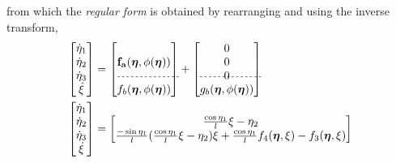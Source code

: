 %
from which the \textit{regular form} is obtained by rearranging and using the inverse transform,
\begin{align}
  \begin{bmatrix}
    \dot{\eta}_1   \\
    \dot{\eta}_2   \\
    \dot{\eta}_3   \\  %
    \dot{\xi}
  \end{bmatrix} 
  &=
  \begin{bmatrix}
    \multirow{3}{*}{$ \vec{f_a}(\vec{\eta},\phi(\vec{\eta})) $}\\
    \\
    \\
    \begin{picture} (0,0)(0,0) \multiput(.5,14)(4,0){14}{\line(2,0){2}} \end{picture}
     f_b(\vec{\eta},\phi(\vec{\eta}))
  \end{bmatrix}
  +
  \begin{bmatrix}
    0 \\
    0 \\
    0 \\
    \begin{picture} (0,0)(0,0) \multiput(-0,14)(4,0){14}{\line(2,0){2}} \end{picture}
    g_b(\vec{\eta},\phi(\vec{\eta})) 
  \end{bmatrix} \\
%
%
  \begin{bmatrix}
    \dot{\eta}_1   \\
    \dot{\eta}_2   \\
    \dot{\eta}_3   \\  %
    \dot{\xi}
  \end{bmatrix} 
  &=
  \begin{bmatrix}
    \frac{\cos \eta_1}{l} \xi - \eta_2    \\
    \frac{-\sin \eta_1}{l} (\frac{\cos \eta_1}{l} \xi - \eta_2) \xi + \frac{\cos \eta_1}{l} f_4(\vec{\eta},\xi) - f_3(\vec{\eta},\xi) \\

\end{bmatrix}
\end{align}

